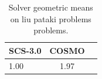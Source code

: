 \begin{table}
\centering
\caption{Solver geometric means on liu pataki problems problems.}
\label{t-liu pataki problems-geom_mean}
\begin{tabular}{lcc}
\toprule
 SCS-3.0 &  COSMO \\
\midrule
    1.00 &   1.97 \\
\bottomrule
\end{tabular}
\end{table}
